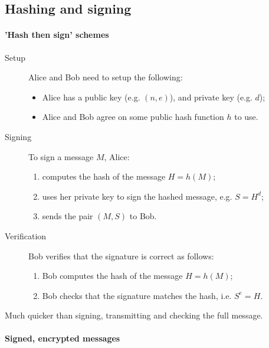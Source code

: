 \documentclass[a4paper, 11pt, openany]{book}
\numberwithin{equation}{section}
\theoremstyle{plain}
\theoremstyle{definition}
\begin{document}
\subsection{Hashing and signing}

\paragraph{'Hash then sign' schemes}

\begin{description}
\item [Setup] Alice and Bob need to setup the following:
\begin{itemize}
    \item Alice has a public key (e.g. $(n,e)$), and private key (e.g. $d$);
    
    \item Alice and Bob agree on some public hash function $h$ to use.
\end{itemize}

\item [Signing] To sign a message $M$, Alice:
\begin{enumerate}
    \item computes the hash of the message $H = h(M)$;
    
    \item uses her private key to sign the hashed message, e.g. $S = H^d$;

    \item sends the pair $(M,S)$ to Bob.
\end{enumerate}

\item [Verification] Bob verifies that the signature is correct as follows:
\begin{enumerate}
    \item Bob computes the hash of the message $H = h(M)$;

    \item Bob checks that the signature matches the hash, i.e. $S^e = H$.
\end{enumerate}
\end{description}

Much quicker than signing, transmitting and checking the full message.



\paragraph{Signed, encrypted messages}
\end{document}
